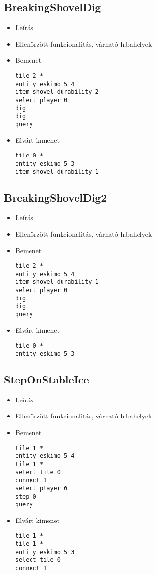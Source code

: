 \subsection{BreakingShovelDig}
\begin{itemize}
\item Leírás\newline
\item Ellenőrzött funkcionalitás, várható hibahelyek
\item Bemenet
\begin{lstlisting}
tile 2 *
entity eskimo 5 4
item shovel durability 2
select player 0
dig
dig
query
\end{lstlisting}
\item Elvárt kimenet
\begin{lstlisting}
tile 0 *
entity eskimo 5 3
item shovel durability 1
\end{lstlisting}
\end{itemize}

\subsection{BreakingShovelDig2}
\begin{itemize}
\item Leírás\newline
\item Ellenőrzött funkcionalitás, várható hibahelyek
\item Bemenet
\begin{lstlisting}
tile 2 *
entity eskimo 5 4
item shovel durability 1
select player 0
dig
dig
query
\end{lstlisting}
\item Elvárt kimenet
\begin{lstlisting}
tile 0 *
entity eskimo 5 3
\end{lstlisting}
\end{itemize}

\subsection{StepOnStableIce}
\begin{itemize}
\item Leírás\newline
\item Ellenőrzött funkcionalitás, várható hibahelyek
\item Bemenet
\begin{lstlisting}
tile 1 *
entity eskimo 5 4
tile 1 *
select tile 0
connect 1
select player 0
step 0
query
\end{lstlisting}
\item Elvárt kimenet
\begin{lstlisting}
tile 1 *
tile 1 *
entity eskimo 5 3
select tile 0
connect 1
\end{lstlisting}
\end{itemize}

